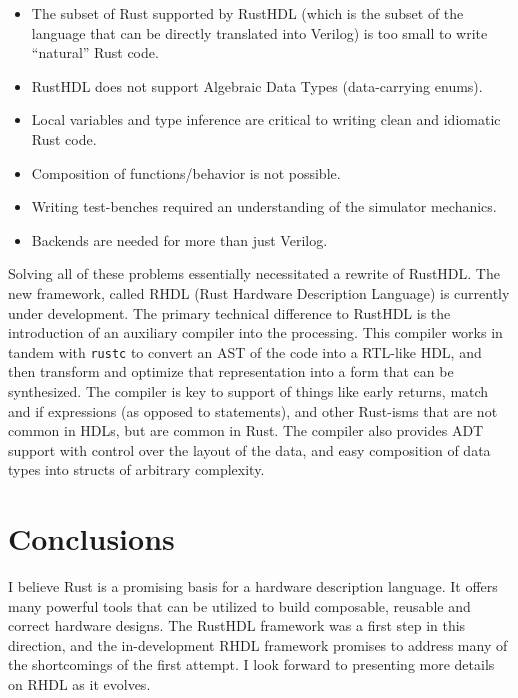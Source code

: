 \documentclass[sigplan,screen,sigconf]{acmart}
\begin{document}
\begin{itemize}
  \item The subset of Rust supported by RustHDL (which is the subset of the language that can be   directly translated into Verilog) is too small to write ``natural'' Rust code. 
  \item RustHDL does not support Algebraic Data Types (data-carrying enums).
  \item Local variables and type inference are critical to writing clean and
  idiomatic Rust code.  
  \item Composition of functions/behavior is not possible. 
  \item Writing test-benches required an understanding of the simulator mechanics.
  \item Backends are needed for more than just Verilog.
\end{itemize}

Solving all of these problems essentially necessitated a rewrite of RustHDL.  The new framework, called RHDL (Rust Hardware Description Language) is currently under development.  The primary technical difference to RustHDL is the introduction of an auxiliary compiler into the processing. This compiler works in tandem with \verb|rustc| to convert an AST of the code into a RTL-like HDL, and then transform and optimize that representation into a form that can be synthesized.  The  compiler is key to support of things like early returns, match and if expressions (as opposed to statements), and other Rust-isms that are not common in HDLs, but are common in Rust.  The compiler also provides
ADT support with control over the layout of the data, and easy composition of data types into structs of arbitrary complexity.  

\section{Conclusions}
I believe Rust is a promising basis for a hardware description language.  It offers many powerful tools that can be utilized to build composable, reusable and correct hardware designs.  The RustHDL framework was a first step in this direction, and the in-development RHDL framework promises to address many of the shortcomings of the first attempt. I look forward to presenting more details on RHDL as it evolves.

\newpage
\end{document}
